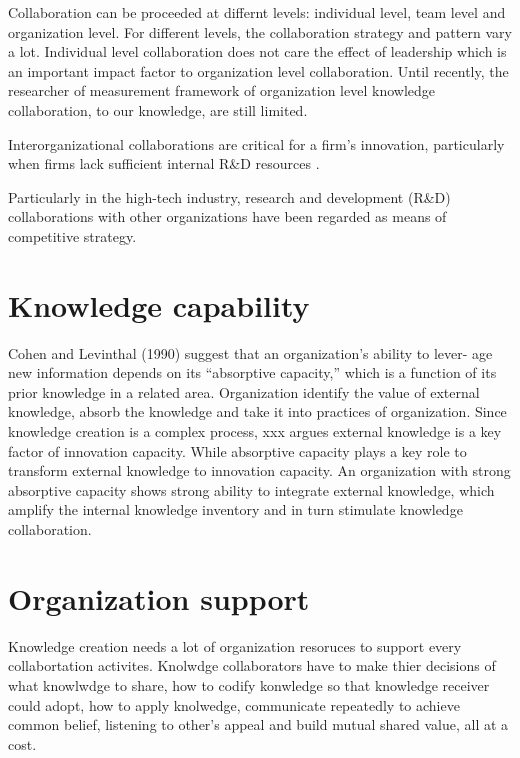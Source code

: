 \documentclass{elsarticle}
\begin{document}
Collaboration can be proceeded at differnt levels: individual level,
team level and organization level. For different levels, the
collaboration strategy
and  pattern vary a lot. Individual level collaboration does not care
the effect of leadership which is an important impact factor to
organization level collaboration. Until recently, the researcher of 
measurement framework of organization level knowledge collaboration,
to our knowledge, are still limited.     

Interorganizational
collaborations are critical for a firm’s innovation, particularly when firms
lack sufficient internal R\&D resources \cite{lin2003technology}.

Particularly in the high-tech
industry, research and development (R\&D) collaborations with other organizations have
been regarded as means of competitive strategy.


\section{Knowledge capability}
\label{sec:knowledge-capability}


Cohen and Levinthal
(1990) suggest that an organization’s ability to lever-
age new information depends on its “absorptive
capacity,” which is a function of its prior knowledge
in a related area. Organization identify the value of external
knowledge, absorb the knowledge and take it into practices of
organization. Since knowledge creation is a complex process, xxx
argues external knowledge is a key factor of innovation
capacity. While absorptive capacity plays a key role to transform external knowledge
to innovation capacity. An
organization with strong absorptive capacity shows strong ability to
integrate external knowledge, which amplify the internal knowledge
inventory and in turn stimulate knowledge collaboration.   

\section{Organization support}
\label{sec:organization-support}

Knowledge creation needs a lot of organization resoruces to support
every collabortation activites. Knolwdge collaborators have to make
thier decisions of 
what knowlwdge to share, how to codify konwledge so that knowledge
receiver could adopt, how to apply knolwedge, communicate repeatedly to
achieve common belief, listening to  other's appeal  and build mutual
shared value, all at a cost.   


\end{document}
